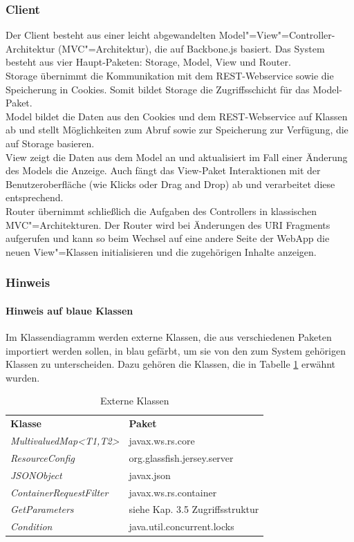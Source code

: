 \subsubsection{Client}
Der Client besteht aus einer leicht abgewandelten Model"=View"=Controller-Architektur (MVC"=Architektur), die auf Backbone.js \cite{backbone} basiert.
Das System besteht aus vier Haupt-Paketen: Storage, Model, View und Router.\\
Storage übernimmt die Kommunikation mit dem REST-Webservice sowie die Speicherung in Cookies. Somit bildet Storage die Zugriffsschicht für das Model-Paket. \\
Model bildet die Daten aus den Cookies und dem REST-Webservice auf Klassen ab und stellt Möglichkeiten zum Abruf sowie zur Speicherung zur Verfügung, die auf Storage basieren.\\
View zeigt die Daten aus dem Model an und aktualisiert im Fall einer Änderung des Models die Anzeige. Auch fängt das View-Paket Interaktionen mit der Benutzeroberfläche (wie Klicks oder Drag and Drop) ab und verarbeitet diese entsprechend.\\
Router übernimmt schließlich die Aufgaben des Controllers in klassischen MVC"=Architekturen. Der Router wird bei Änderungen des URI Fragments aufgerufen und kann so beim Wechsel auf eine andere Seite der WebApp die neuen View"=Klassen initialisieren und die zugehörigen Inhalte anzeigen.

\subsubsection{Hinweis}  %
\paragraph{Hinweis auf blaue Klassen}Im Klassendiagramm werden externe Klassen, die aus verschiedenen Paketen importiert werden sollen, in blau gefärbt, um sie von den zum System gehörigen Klassen zu unterscheiden. Dazu gehören die Klassen, die in Tabelle \ref{tab:extern_classes} erwähnt wurden.
\begin{table}
	\begin{tabular}{@{} | p{} | p{} | @{}} 
		\hline
		\textbf{Klasse} & \textbf{Paket}\\ \hhline{|=|=|}
		\textit{MultivaluedMap<T1,T2>} & javax.ws.rs.core \\ \hline
		\textit{ResourceConfig} & org.glassfish.jersey.server \\ \hline
		\textit{JSONObject} & javax.json \\ \hline
		\textit{ContainerRequestFilter} & javax.ws.rs.container \\ \hline
		\textit{GetParameters} & siehe Kap. 3.5 Zugriffsstruktur \\
		\hline
		\textit{Condition} & java.util.concurrent.locks \\
		\hline
	\end{tabular}
	\caption{Externe Klassen}
	\label{tab:extern_classes}
\end{table}
